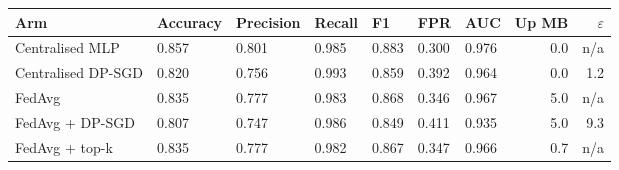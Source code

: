 \begin{tabular}{lp{1.3cm}p{1.3cm}p{1.3cm}p{1.3cm}p{1.3cm}p{1.3cm}rr}
\toprule
Arm & Accuracy & Precision & Recall & F1 & FPR & AUC & Up MB & $\varepsilon$ \\
\midrule
Centralised MLP & 0.857\newline{\scriptsize [0.852, 0.862]} & 0.801\newline{\scriptsize [0.794, 0.809]} & 0.985\newline{\scriptsize [0.980, 0.989]} & 0.883\newline{\scriptsize [0.880, 0.887]} & 0.300\newline{\scriptsize [0.284, 0.315]} & 0.976\newline{\scriptsize [0.975, 0.977]} & 0.0 & n/a \\
Centralised DP-SGD & 0.820\newline{\scriptsize [0.819, 0.821]} & 0.756\newline{\scriptsize [0.755, 0.758]} & 0.993\newline{\scriptsize [0.993, 0.994]} & 0.859\newline{\scriptsize [0.858, 0.860]} & 0.392\newline{\scriptsize [0.389, 0.395]} & 0.964\newline{\scriptsize [0.963, 0.964]} & 0.0 & 1.2 \\
FedAvg & 0.835\newline{\scriptsize [0.828, 0.842]} & 0.777\newline{\scriptsize [0.767, 0.787]} & 0.983\newline{\scriptsize [0.975, 0.990]} & 0.868\newline{\scriptsize [0.864, 0.872]} & 0.346\newline{\scriptsize [0.323, 0.368]} & 0.967\newline{\scriptsize [0.965, 0.968]} & 5.0 & n/a \\
FedAvg + DP-SGD & 0.807\newline{\scriptsize [0.799, 0.816]} & 0.747\newline{\scriptsize [0.735, 0.758]} & 0.986\newline{\scriptsize [0.977, 0.995]} & 0.849\newline{\scriptsize [0.844, 0.855]} & 0.411\newline{\scriptsize [0.384, 0.438]} & 0.935\newline{\scriptsize [0.928, 0.942]} & 5.0 & 9.3 \\
FedAvg + top-k & 0.835\newline{\scriptsize [0.828, 0.841]} & 0.777\newline{\scriptsize [0.766, 0.788]} & 0.982\newline{\scriptsize [0.975, 0.990]} & 0.867\newline{\scriptsize [0.863, 0.872]} & 0.347\newline{\scriptsize [0.323, 0.370]} & 0.966\newline{\scriptsize [0.964, 0.968]} & 0.7 & n/a \\

\end{tabular}
